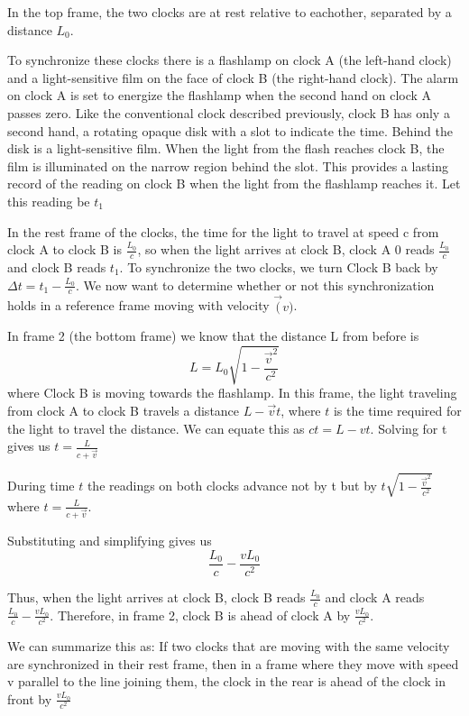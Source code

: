 \documentclass{article}
\begin{document}
In the top frame, the two clocks are at rest relative to eachother, separated by a distance \(L_0\).

To synchronize these clocks there is a flashlamp on clock A (the left-hand clock) and a light-sensitive film on the face of clock B (the right-hand clock). The alarm on clock A is set to energize the flashlamp when the second hand on clock A passes zero. Like the conventional clock described previously, clock B has only a second hand, a rotating opaque disk with a slot to indicate the time. Behind the disk is a light-sensitive film. When the light from the flash reaches clock B, the film is illuminated on the narrow region behind the slot. This provides a lasting record of the reading on clock B when the light from the flashlamp reaches it. Let this reading be \(t_1\)

In the rest frame of the clocks, the time for the light to travel at speed c from clock A
to clock B is \(\frac{L_0}{c}\), so when the light arrives at clock B, clock A 0
reads  \(\frac{L_0}{c}\) and clock B reads \(t_1\). To synchronize the two clocks, we turn Clock B back by \(\Delta t = t_1 - \frac{L_0}{c}\). We now want to determine whether or not this synchronization holds in a reference frame moving with velocity \(\vec(v)\).

In frame 2 (the bottom frame) we know that the distance L from before is
\[
  L = L_0\sqrt{1 - \frac{\vec{v}^2}{c^2}}
\]
where Clock B is moving towards the flashlamp. In this frame, the light traveling from clock A to clock B travels a distance \(L - \vec{v}t\), where \(t\) is the time required for the light to travel the distance. We can equate this as \(ct = L - vt\). Solving for t gives us \(t = \frac{L}{c + \vec{v}}\)

During time \(t\) the readings on both clocks advance not by t but by \(t\sqrt{1 - \frac{\vec{v}^2}{c^2}}\) where \(t = \frac{L}{c + \vec{v}}\).

Substituting and simplifying gives us
\[
  \frac{L_0}{c} - \frac{vL_0}{c^2}
\]

Thus, when the light arrives at clock B, clock B reads \(\frac{L_0}{c}\) and clock A reads \(\frac{L_0}{c} - \frac{vL_0}{c^2}\). Therefore, in frame 2, clock B is ahead of clock A by \(\frac{vL_0}{c^2}\).


We can summarize this as:\newline
If two clocks that are moving with the same velocity are synchronized in their rest frame, then in a frame where they move with speed v parallel to the line joining them, the clock in the rear is ahead of the clock in front by \(\frac{vL_0}{c^2}\)
\end{document}
